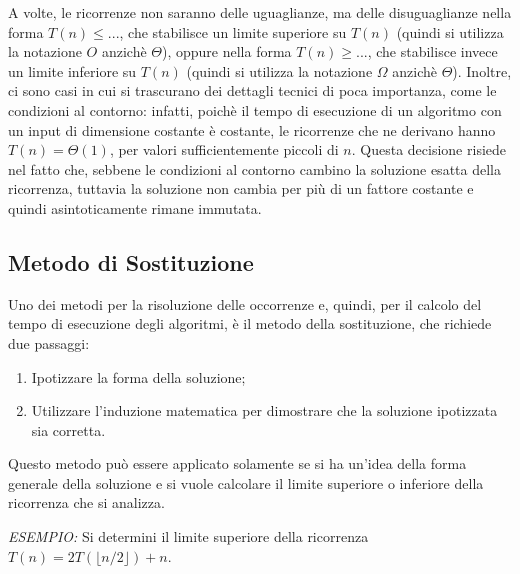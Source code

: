 A volte, le ricorrenze non saranno delle uguaglianze, ma delle disuguaglianze nella forma \(T(n) \le ...\), che stabilisce un limite superiore su \(T(n)\) (quindi si utilizza la notazione \(O\) anzichè \(\Theta\)), oppure nella forma \(T(n) \ge ...\), che stabilisce invece un limite inferiore su \(T(n)\) (quindi si utilizza la notazione \(\Omega\) anzichè \(\Theta\)). Inoltre, ci sono casi in cui si trascurano dei dettagli tecnici di poca importanza, come le condizioni al contorno: infatti, poichè il tempo di esecuzione di un algoritmo con un input di dimensione costante è costante, le ricorrenze che ne derivano hanno \(T(n)=\Theta(1)\), per valori sufficientemente piccoli di \(n\). Questa decisione risiede nel fatto che, sebbene le condizioni al contorno cambino la soluzione esatta della ricorrenza, tuttavia la soluzione non cambia per più di un fattore costante e quindi asintoticamente rimane immutata.

\subsection{Metodo di Sostituzione}
Uno dei metodi per la risoluzione delle occorrenze e, quindi, per il calcolo del tempo di esecuzione degli algoritmi, è il metodo della sostituzione, che richiede due passaggi:
\begin{enumerate}
  \item Ipotizzare la forma della soluzione;
  \item Utilizzare l'induzione matematica per dimostrare che la soluzione ipotizzata sia corretta.
\end{enumerate}
Questo metodo può essere applicato solamente se si ha un'idea della forma generale della soluzione e si vuole calcolare il limite superiore o inferiore della ricorrenza che si analizza.

\textit{ESEMPIO:} Si determini il limite superiore della ricorrenza \(T(n)=2T(\lfloor n/2 \rfloor)+n\).


